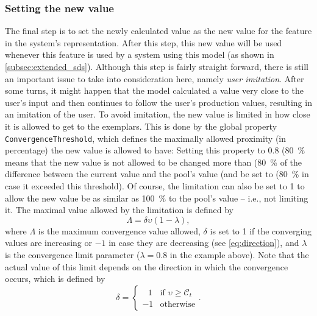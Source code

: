 
\subsubsection{Setting the new value}
\label{subsubsec:setting_the_new_value}

The final step is to set the newly calculated value as the new value for the feature in the system's representation.
After this step, this new value will be used whenever this feature is used by a system using this model (as shown in \cref{subsec:extended_sds}).
Although this step is fairly straight forward, there is still an important issue to take into consideration here, namely \textit{user imitation}.
After some turns, it might happen that the model calculated a value very close to the user's input and then continues to follow the user's production values, resulting in an imitation of the user.
To avoid imitation, the new value is limited in how close it is allowed to get to the exemplars.
This is done by the global property \texttt{ConvergenceThreshold}, which defines the maximally allowed proximity (in percentage) the new value is allowed to have:
Setting this property to 0.8 (\SI{80}{\percent} means that the new value is not allowed to be changed more than (\SI{80}{\percent} of the difference between the current value and the pool's value (and be set to (\SI{80}{\percent} in case it exceeded this threshold).
Of course, the limitation can also be set to 1 to allow the new value be as similar as \SI{100}{\percent} to the pool's value -- i.e., not limiting it.
The maximal value allowed by the limitation is defined by
%
\begin{equation}
	\label{eq:conv_limit}
	\Lambda = \delta \upsilon \left(1 - \lambda \right),
\end{equation}
\noindent
%
where $\Lambda$ is the maximum convergence value allowed, $\delta$ is set to 1 if the converging values are increasing or $-1$ in case they are decreasing (see \cref{eq:direction}), and $\lambda$ is the convergence limit parameter ($\lambda=0.8$ in the example above).
\noindent
Note that the actual value of this limit depends on the direction in which the convergence occurs, which is defined by
%
\begin{equation}
	\label{eq:direction}
	\delta = 		
	\begin{cases}
		\ \ \ 1 & \text{if } \upsilon \geq \mathcal{C}_t\\
		-1 & \text{otherwise}
	\end{cases}.
\end{equation}
